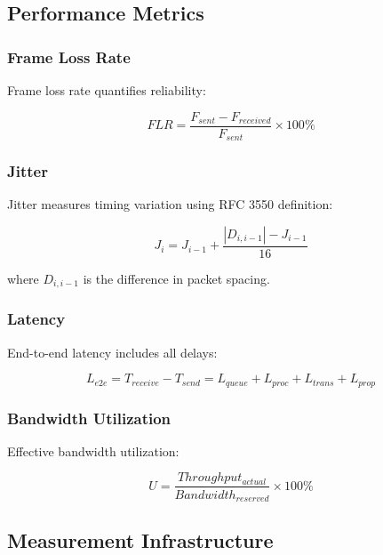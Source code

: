 \documentclass[10pt, journal, compsoc]{IEEEtran}
\begin{document}
\subsection{Performance Metrics}

\subsubsection{Frame Loss Rate}

Frame loss rate quantifies reliability:

\begin{equation}
FLR = \frac{F_{sent} - F_{received}}{F_{sent}} \times 100\%
\end{equation}

\subsubsection{Jitter}

Jitter measures timing variation using RFC 3550 definition:

\begin{equation}
J_i = J_{i-1} + \frac{|D_{i,i-1}| - J_{i-1}}{16}
\end{equation}

where $D_{i,i-1}$ is the difference in packet spacing.

\subsubsection{Latency}

End-to-end latency includes all delays:

\begin{equation}
L_{e2e} = T_{receive} - T_{send} = L_{queue} + L_{proc} + L_{trans} + L_{prop}
\end{equation}

\subsubsection{Bandwidth Utilization}

Effective bandwidth utilization:

\begin{equation}
U = \frac{Throughput_{actual}}{Bandwidth_{reserved}} \times 100\%
\end{equation}

\subsection{Measurement Infrastructure}
\end{document}
